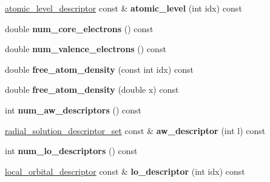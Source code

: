 \begin{DoxyCompactItemize}
\item 
\hypertarget{classsirius_1_1_atom__type_aa01c402ee22a08efd46c6c21eec36e00}{}\hyperlink{structatomic__level__descriptor}{atomic\+\_\+level\+\_\+descriptor} const \& {\bfseries atomic\+\_\+level} (int idx) const \label{classsirius_1_1_atom__type_aa01c402ee22a08efd46c6c21eec36e00}

\item 
\hypertarget{classsirius_1_1_atom__type_aa7b91a6a0b3ec7c768bf677e75c8b7be}{}double {\bfseries num\+\_\+core\+\_\+electrons} () const \label{classsirius_1_1_atom__type_aa7b91a6a0b3ec7c768bf677e75c8b7be}

\item 
\hypertarget{classsirius_1_1_atom__type_a5f7fdcfb55e7f1d625e0a42677f92e9b}{}double {\bfseries num\+\_\+valence\+\_\+electrons} () const \label{classsirius_1_1_atom__type_a5f7fdcfb55e7f1d625e0a42677f92e9b}

\item 
\hypertarget{classsirius_1_1_atom__type_a4468e53beeb6b3de1be0f6498b448d6c}{}double {\bfseries free\+\_\+atom\+\_\+density} (const int idx) const \label{classsirius_1_1_atom__type_a4468e53beeb6b3de1be0f6498b448d6c}

\item 
\hypertarget{classsirius_1_1_atom__type_a1e480444d9c8c59149e21afc942e90f2}{}double {\bfseries free\+\_\+atom\+\_\+density} (double x) const \label{classsirius_1_1_atom__type_a1e480444d9c8c59149e21afc942e90f2}

\item 
\hypertarget{classsirius_1_1_atom__type_ab2d9ff00ae791d6019fc7ff99c340f2f}{}int {\bfseries num\+\_\+aw\+\_\+descriptors} () const \label{classsirius_1_1_atom__type_ab2d9ff00ae791d6019fc7ff99c340f2f}

\item 
\hypertarget{classsirius_1_1_atom__type_a77a3d374cea0880129ebacc18a345fec}{}\hyperlink{descriptors_8h_aec4b6e691d842d5c6b06552800a478b3}{radial\+\_\+solution\+\_\+descriptor\+\_\+set} const \& {\bfseries aw\+\_\+descriptor} (int l) const \label{classsirius_1_1_atom__type_a77a3d374cea0880129ebacc18a345fec}

\item 
\hypertarget{classsirius_1_1_atom__type_a241bb325661e3233232d58eab60b61de}{}int {\bfseries num\+\_\+lo\+\_\+descriptors} () const \label{classsirius_1_1_atom__type_a241bb325661e3233232d58eab60b61de}

\item 
\hypertarget{classsirius_1_1_atom__type_a2c7261eddf3c05b280208a40d3623d6b}{}\hyperlink{structlocal__orbital__descriptor}{local\+\_\+orbital\+\_\+descriptor} const \& {\bfseries lo\+\_\+descriptor} (int idx) const \label{classsirius_1_1_atom__type_a2c7261eddf3c05b280208a40d3623d6b}


\end{DoxyCompactItemize}

